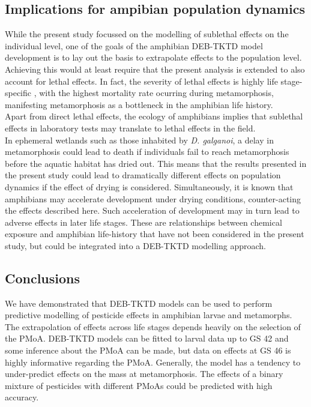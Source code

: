 \documentclass[utf8]{FrontiersinHarvard} %
\begin{document}
\subsection{Implications for ampibian population dynamics}
\noindent
While the present study focussed on the modelling of sublethal effects on the individual level, 
one of the goals of the amphibian DEB-TKTD model development is to lay out the basis to extrapolate effects to the population level.
Achieving this would at least require that the present analysis is extended to also account for lethal effects. 
In fact, the severity of lethal effects is highly life stage-specific \citep{gonzalez-lopezChronicExposurePesticides2026}, 
with the highest mortality rate ocurring during metamorphosis, 
manifesting metamorphosis as a bottleneck in the amphibian life history.\\ 
Apart from direct lethal effects, the ecology of amphibians implies that sublethal effects in laboratory tests 
may translate to lethal effects in the field.\\
In ephemeral wetlands such as those inhabited by \textit{D. galganoi},
a delay in metamorphosis could lead to death if individuals fail to reach metamorphosis 
before the aquatic habitat has dried out. 
This means that the results presented in the present study could lead 
to dramatically different effects on population dynamics if the effect of drying is considered. 
Simultaneously, it is known that amphibians may accelerate development under drying conditions, 
counter-acting the effects described here. 
Such acceleration of development may in turn lead to adverse effects in later life stages. 
These are relationships between chemical exposure and amphibian life-history that have not been considered 
in the present study, but could be integrated into a DEB-TKTD modelling approach.
%
\subsection{Conclusions}
\noindent 
We have demonstrated that DEB-TKTD models can be used to perform predictive modelling 
of pesticide effects in amphibian larvae and metamorphs.
The extrapolation of effects across life stages depends heavily on the selection of the PMoA. 
DEB-TKTD models can be fitted to larval data up to GS 42 and some inference about the PMoA can be made, 
but data on effects at GS 46 is highly informative regarding the PMoA.
Generally, the model has a tendency to under-predict effects on the mass at metamorphosis. 
The effects of a binary mixture of pesticides with different PMoAs could be predicted with high accuracy.
\end{document}
